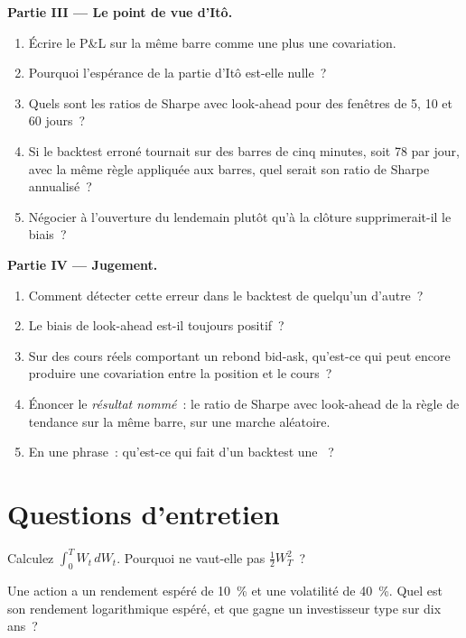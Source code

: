 \begin{problem}
\medskip\noindent\textbf{Partie III --- Le point de vue d'Itô.}
\begin{enumerate}[resume]
\item Écrire le P\&L sur la même barre comme une  plus une covariation.
\item Pourquoi l'espérance de la partie d'Itô est-elle nulle~?
\item Quels sont les ratios de Sharpe avec look-ahead pour des fenêtres de 5, 10 et 60 jours~?
\item Si le backtest erroné tournait sur des barres de cinq minutes, soit 78 par jour, avec la même règle appliquée aux barres, quel serait son ratio de Sharpe annualisé~?
\item Négocier à l'ouverture du lendemain plutôt qu'à la clôture supprimerait-il le biais~?
\end{enumerate}

\medskip\noindent\textbf{Partie IV --- Jugement.}
\begin{enumerate}[resume]
\item Comment détecter cette erreur dans le backtest de quelqu'un d'autre~?
\item Le biais de look-ahead est-il toujours positif~?
\item Sur des cours réels comportant un rebond bid-ask, qu'est-ce qui peut encore produire une covariation entre la position et le cours~?
\item Énoncer le \emph{résultat nommé}~: le ratio de Sharpe avec look-ahead de la règle de tendance sur la même barre, sur une marche aléatoire.
\item En une phrase~: qu'est-ce qui fait d'un backtest une ~?
\end{enumerate}
\end{problem}

\section{Questions d'entretien}

\begin{interviewq}\label{iq:qm:ito-calculus:1}
Calculez $\int_0^TW_t\,dW_t$. Pourquoi ne vaut-elle pas $\tfrac12W_T^2$~?
\end{interviewq}

\begin{interviewq}\label{iq:qm:ito-calculus:2}
Une action a un rendement espéré de 10~\% et une volatilité de 40~\%. Quel est son rendement logarithmique espéré,
et que gagne un investisseur type sur dix ans~?
\end{interviewq}


